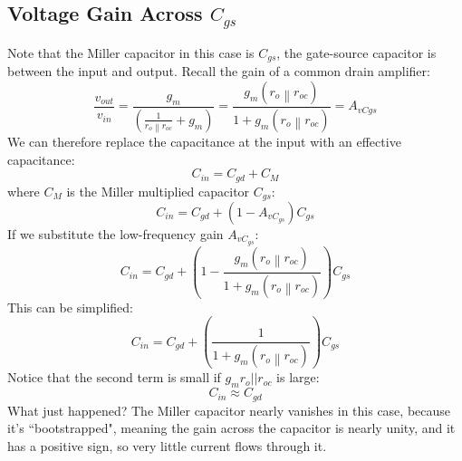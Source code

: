 \subsection{Voltage Gain Across \texorpdfstring{$C_{gs}$}{ the Gate-Source Capacitance}}
Note that the Miller capacitor in this case is $C_{gs}$, the gate-source capacitor is between the input and output.  Recall the gain of a common drain amplifier:
    \begin{equation}
        \frac{{{v_{out}}}}{{{v_{in}}}} = \frac{{{g_m}}}{{\left( {\frac{1}{{\left. {{r_o}} \right\|{r_{oc}}}} + {g_m}} \right)}} = \frac{{{g_m}(\left. {{r_o}} \right\|{r_{oc}})}}{{1 + {g_m}(\left. {{r_o}} \right\|{r_{oc}})}} = {A_{vCgs}}
    \end{equation}
We can therefore replace the capacitance at the input with an effective capacitance:
    \begin{equation} 
        {C_{in}} = {C_{gd}} + {C_M} 
    \end{equation}
where $C_M$ is the Miller multiplied capacitor $C_{gs}$:
    \begin{equation} 
        {C_{in}} = {C_{gd}} + (1 - {A_{v{C_{gs}}}}){C_{gs}} 
    \end{equation}
If we substitute the low-frequency gain $A_{v{C_{gs}}}$:
    \begin{equation} 
        {C_{in}} = {C_{gd}} + \left(1 - \frac{{{g_m}(\left. {{r_o}} \right\|{r_{oc}})}}{{1 + {g_m}(\left. {{r_o}} \right\|{r_{oc}})}} \right){C_{gs}}
    \end{equation}
This can be simplified:
    \begin{equation} 
        {C_{in}} = {C_{gd}} + \left(\frac{1}{{1 + {g_m}(\left. {{r_o}} \right\|{r_{oc}})}} \right){C_{gs}} 
    \end{equation}
Notice that the second term is small if $g_m r_o || r_{oc}$ is large:
    \begin{equation} 
        {C_{in}} \approx {C_{gd}} 
    \end{equation}
What just happened?  The Miller capacitor nearly vanishes in this case, because it's ``bootstrapped", meaning the gain across the capacitor is nearly unity, and it has a positive sign, so very little current flows through it.
